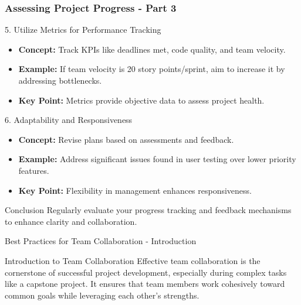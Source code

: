 \documentclass[aspectratio=169]{beamer}
\begin{document}
\begin{frame}[fragile]
    \frametitle{Assessing Project Progress - Part 3}
    \begin{block}{5. Utilize Metrics for Performance Tracking}
        \begin{itemize}
            \item \textbf{Concept:} Track KPIs like deadlines met, code quality, and team velocity.
            \item \textbf{Example:} If team velocity is 20 story points/sprint, aim to increase it by addressing bottlenecks.
            \item \textbf{Key Point:} Metrics provide objective data to assess project health.
        \end{itemize}
    \end{block}

    \begin{block}{6. Adaptability and Responsiveness}
        \begin{itemize}
            \item \textbf{Concept:} Revise plans based on assessments and feedback.
            \item \textbf{Example:} Address significant issues found in user testing over lower priority features.
            \item \textbf{Key Point:} Flexibility in management enhances responsiveness.
        \end{itemize}
    \end{block}

    \begin{block}{Conclusion}
        Regularly evaluate your progress tracking and feedback mechanisms to enhance clarity and collaboration.
    \end{block}
\end{frame}

\begin{frame}[fragile]{Best Practices for Team Collaboration - Introduction}
    \begin{block}{Introduction to Team Collaboration}
        Effective team collaboration is the cornerstone of successful project development, especially during complex tasks like a capstone project. It ensures that team members work cohesively toward common goals while leveraging each other's strengths.
    \end{block}
\end{frame}
\end{document}
